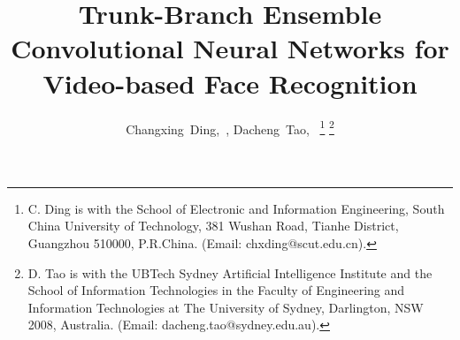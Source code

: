 \documentclass[10pt,journal,cspaper,compsoc]{IEEEtran}
\begin{document}
%
\title{Trunk-Branch Ensemble Convolutional Neural Networks for Video-based Face Recognition}
%
%
%
%
\author{Changxing~Ding,~,
        Dacheng~Tao,~
\thanks{C. Ding is with the School of Electronic and Information Engineering,
South China University of Technology, 381 Wushan Road, Tianhe District, Guangzhou 510000, P.R.China.
(Email: chxding@scut.edu.cn).}
\thanks{D. Tao is with the UBTech Sydney Artificial Intelligence Institute and the School of Information Technologies
in the Faculty of Engineering and Information Technologies at The University of Sydney, Darlington, NSW 2008, Australia.
(Email: dacheng.tao@sydney.edu.au).}}%


\end{document}
